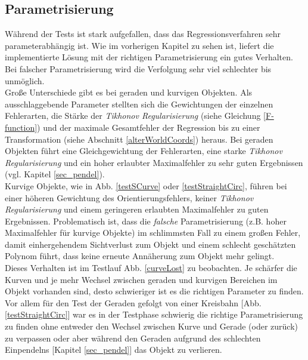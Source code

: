 \subsection{Parametrisierung}
\label{sec_param}
Während der Tests ist stark aufgefallen, dass das Regressionsverfahren sehr parameterabhängig ist. Wie im vorherigen Kapitel zu sehen ist, liefert die implementierte Lösung mit der richtigen Parametrisierung ein gutes Verhalten. 
Bei falscher Parametrisierung wird die Verfolgung sehr viel schlechter bis unmöglich.\\
Große Unterschiede gibt es bei geraden und kurvigen Objekten. Als ausschlaggebende Parameter stellten sich die Gewichtungen der einzelnen Fehlerarten, die Stärke der \textit{Tikhonov Regularisierung} (siehe Gleichung \ref{F-function}) und der maximale Gesamtfehler der Regression bis zu einer Transformation (siehe Abschnitt \ref{alterWorldCoords}) heraus.
Bei geraden Objekten führt eine Gleichgewichtung der Fehlerarten, eine starke \textit{Tikhonov Regularisierung} und ein hoher erlaubter Maximalfehler zu sehr guten Ergebnissen (vgl. Kapitel \ref{sec_pendel}).\\
Kurvige Objekte, wie in Abb. \ref{testSCurve} oder \ref{testStraightCirc}, führen bei einer höheren Gewichtung des Orientierungsfehlers, keiner \textit{Tikhonov Regularisierung} und einem geringeren erlaubten Maximalfehler zu guten Ergebnissen.
Problematisch ist, dass die \textit{falsche} Parametrisierung (z.B. hoher Maximalfehler für kurvige Objekte) im schlimmsten Fall zu einem großen Fehler, damit einhergehendem Sichtverlust zum Objekt und einem schlecht geschätzten Polynom führt, dass keine erneute Annäherung zum Objekt mehr gelingt. \\
Dieses Verhalten ist im Testlauf Abb. \ref{curveLost} zu beobachten. Je schärfer die Kurven und je mehr Wechsel zwischen geraden und kurvigen Bereichen im Objekt vorhanden sind, desto schwieriger ist es die richtigen Parameter zu finden. Vor allem für den Test der Geraden gefolgt von einer Kreisbahn [Abb. \ref{testStraightCirc}] war es in der Testphase schwierig die richtige Parametrisierung zu finden ohne entweder den Wechsel zwischen Kurve und Gerade (oder zurück) zu verpassen oder aber während den Geraden aufgrund des schlechten Einpendelns [Kapitel \ref{sec_pendel}] das Objekt zu verlieren.

